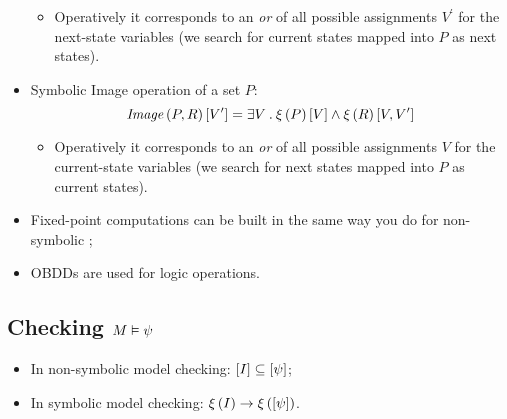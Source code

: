 \begin{itemize}
\begin{itemize}
        \item   Operatively it corresponds to an \emph{or} of all possible
                assignments $V^\prime$ for the next-state variables (we
                search for current states mapped into $P$ as next states).

        \end{itemize}

    \item   Symbolic Image operation of a set $P$:
        \[
        \mbox{\emph{Image}}\left({P,R}\right)[V'] = \exists V \:.\: \xi\left({P}\right)[V] \wedge
                          \xi\left({R}\right)[V, V^\prime]
        \]
        \begin{itemize}

        \item   Operatively it corresponds to an \emph{or} of all possible
                assignments $V$ for the current-state variables (we search
                for next states mapped into $P$ as current states).

        \end{itemize}

    \item   Fixed-point computations can be built in the same way you do
            for non-symbolic \CTL;

    \item   OBDDs are used for logic operations.

    \end{itemize}

\subsection{Checking $M \vDash \psi$}

    \begin{itemize}

    \item   In non-symbolic model checking: $\left[{I}\right] \subseteq
            \left[{\psi}\right]$;

    \item   In symbolic model checking: $\xi\left({I}\right) \rightarrow
            \xi\left({\left[{\psi}\right]}\right)$.

    \end{itemize}


